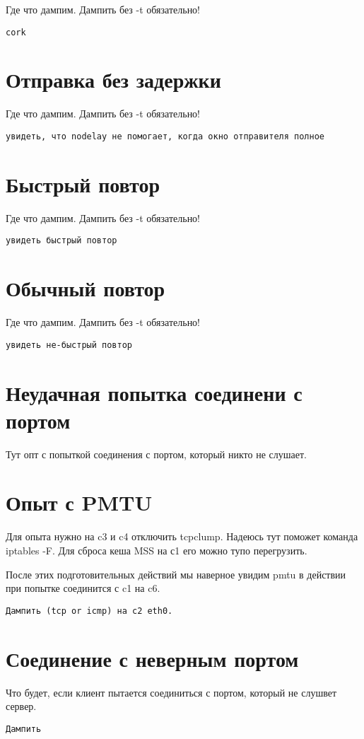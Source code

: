 \documentclass[a4paper,12pt]{article}
\begin{document}
Где что дампим.  Дампить без -t обязательно!

\begin{Verbatim}
cork
\end{Verbatim}

\section{Отправка без задержки}

Где что дампим.  Дампить без -t обязательно!

\begin{Verbatim}
увидеть, что nodelay не помогает, когда окно отправителя полное
\end{Verbatim}

\section{Быстрый повтор}

Где что дампим.  Дампить без -t обязательно!

\begin{Verbatim}
увидеть быстрый повтор
\end{Verbatim}

\section{Обычный повтор}

Где что дампим. Дампить без -t обязательно!

\begin{Verbatim}
увидеть не-быстрый повтор
\end{Verbatim}

\section{Неудачная попытка соединени с портом}

Тут опт с попыткой соединения с портом, который никто не слушает.

\section{Опыт с PMTU}

Для опыта нужно на c3 и c4 отключить tcpclump.
Надеюсь тут поможет команда iptables -F.
Для сброса кеша MSS на с1 его можно тупо перегрузить.

После этих подготовительных действий мы наверное увидим pmtu в действии при попытке соединится с c1 на c6.

\begin{Verbatim}
Дампить (tcp or icmp) на c2 eth0.
\end{Verbatim}

\section{Соединение с неверным портом}

Что будет, если клиент пытается соединиться с портом, который не слушвет сервер.

\begin{Verbatim}
Дампить
\end{Verbatim}
\end{document}
